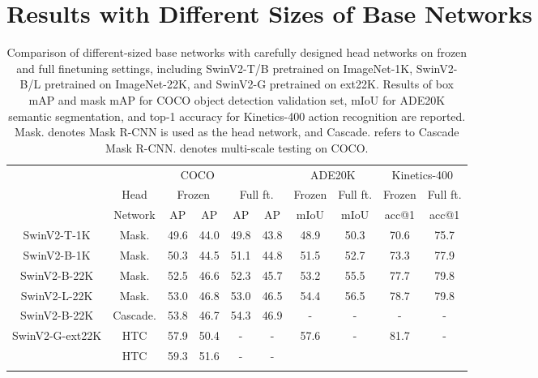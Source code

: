 \documentclass{article}
\begin{document}
\section{Results with Different Sizes of Base Networks}
\label{sec:different_size_result}

\begin{table}[htb]
        \centering
        \addtolength{\tabcolsep}{-2.5pt}
        \begin{tabular}{c|ccccc|cc|cc}
            \Xhline{1.0pt}
            \multirow{3}{*}{Base Network} & \multicolumn{5}{c|}{COCO} & \multicolumn{2}{c|}{ADE20K} & \multicolumn{2}{c}{Kinetics-400}\\
            & {Head} &  \multicolumn{2}{c}{Frozen}& \multicolumn{2}{c|}{Full ft.} & Frozen & Full ft. & Frozen & Full ft. \\
            & Network &  AP & AP & AP & AP & mIoU & mIoU & acc@1 & acc@1 \\
            \hline
            SwinV2-T-1K & Mask.  & 49.6 & 44.0 & 49.8 & 43.8 & 48.9 & 50.3 &  70.6 & 75.7  \\
            SwinV2-B-1K & Mask. & 50.3 & 44.5 & 51.1 & 44.8 & 51.5 & 52.7 & 73.3 & 77.9  \\
            SwinV2-B-22K & Mask. & 52.5 & 46.6 & 52.3 & 45.7 & 53.2 & 55.5 & 77.7 & 79.8 \\
            SwinV2-L-22K & Mask.  & 53.0 & 46.8 & 53.0 & 46.5 & 54.4 & 56.5 & 78.7 & 79.8 \\
            \hline
            SwinV2-B-22K & Cascade.  & 53.8 & 46.7 & 54.3 & 46.9 &- & - & -&- \\
            \multirow{2}{*}{SwinV2-G-ext22K} & HTC  & 57.9 & 50.4 & - & - & \multirow{2}{*}{57.6} & \multirow{2}{*}{-}& \multirow{2}{*}{81.7} & \multirow{2}{*}{-} \\
             & HTC  & 59.3 & 51.6 & - & - &  & &  & \\
          \Xhline{1.0pt}  
       \end{tabular}
     \caption{Comparison of different-sized base networks with carefully designed head networks on frozen and full finetuning settings, including SwinV2-T/B pretrained on ImageNet-1K,  SwinV2-B/L pretrained on ImageNet-22K, and SwinV2-G pretrained on ext22K. Results of box mAP and mask mAP for COCO object detection validation set, mIoU for ADE20K semantic segmentation, and top-1 accuracy for Kinetics-400 action recognition are reported. Mask. denotes Mask R-CNN is used as the head network, and Cascade. refers to Cascade Mask R-CNN.  denotes multi-scale testing on COCO.}
     \label{tab:3b}
\end{table}
\end{document}

